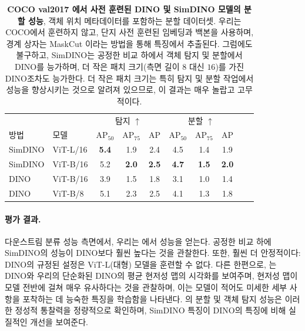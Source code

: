 \documentclass[../../book-main_ko.tex]{subfiles}
\begin{document}
\begin{table}
    \centering
    \begin{tabular}{@{}llcccccccc@{}}
        \toprule
         &  & \multicolumn{3}{c}{탐지 $\uparrow$} &  \multicolumn{3}{c}{분할 $\uparrow$} \\
        방법 & 모델 & AP$_{50}$  & AP$_{75}$ & AP & AP$_{50}$ & AP$_{75}$ & AP  \\ 
        \midrule
        SimDINO &ViT-L/16 &\bf 5.4 &1.9 &2.4 &4.5 &1.4 &1.9 \\
        SimDINO &ViT-B/16 &5.2 & \bf 2.0 & \bf 2.5 & \bf4.7 & \bf 1.5 & \bf 2.0 \\
        DINO &ViT-B/16 &3.9 &1.5 &1.8 &3.1 &1.0 &1.4 \\
        \midrule
        \color{gray} DINO & \color{gray} ViT-B/8 & \color{gray}5.1 & \color{gray}2.3 & \color{gray}2.5 & \color{gray}4.1 & \color{gray}1.3 & \color{gray}1.8 \\
        \bottomrule
    \end{tabular}
    \caption{\small\textbf{COCO val2017 \citep{lin2014microsoft}에서 사전 훈련된 DINO 및 SimDINO 모델의 분할 성능}, 객체 위치 메타데이터를 포함하는 분할 데이터셋. 우리는 COCO에서 훈련하지 않고, 단지 사전 훈련된 임베딩과 백본을 사용하며, 경계 상자는 MaskCut \citep{wang2023cut}이라는 방법을 통해 특징에서 추출된다. 그럼에도 불구하고, SimDINO는 공정한 비교 하에서 객체 탐지 및 분할에서 DINO를 능가하며, 더 작은 패치 크기(측면 길이 \(8\) 대신 \(16\))를 가진 DINO조차도 능가한다. 더 작은 패치 크기는 특히 탐지 및 분할 작업에서 성능을 향상시키는 것으로 알려져 있으므로, 이 결과는 매우 놀랍고 고무적이다.}
    \label{tab:dino_segmentation}
\end{table}

\paragraph{평가 결과.} 다운스트림 분류 성능 측면에서, 우리는 에서 성능을 얻는다. 공정한 비교 하에 SimDINO의 성능이 DINO보다 훨씬 높다는 것을 관찰한다. 또한, 훨씬 더 안정적이다: DINO의 규정된 설정은 ViT-L(대형) 모델을 훈련할 수 없다. 다른 한편으로, 는 DINO와 우리의 단순화된 DINO의 평균 현저성 맵의 시각화를 보여주며, 현저성 맵이 모델 전반에 걸쳐 매우 유사하다는 것을 관찰하며, 이는 모델이 적어도 미세한 세부 사항을 포착하는 데 능숙한 특징을 학습함을 나타낸다. 의 분할 및 객체 탐지 성능은 이러한 정성적 통찰력을 정량적으로 확인하며, SimDINO 특징이 DINO의 특징에 비해 실질적인 개선을 보여준다.
\end{document}
